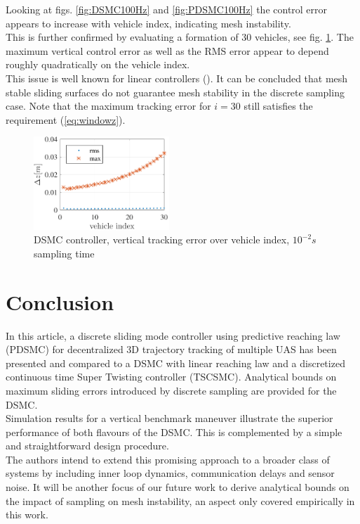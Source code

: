 \documentclass{ifacconf}
\newcommand{\idxFollower}{{\ensuremath{i} }}
\begin{document}
Looking at figs.  \ref{fig:DSMC100Hz} and \ref{fig:PDSMC100Hz} the control error appears to increase with vehicle index, indicating mesh instability.\\
This is further confirmed by evaluating a formation of 30 vehicles, see fig. \ref{fig:errroamplification}. The maximum vertical control error as well as the RMS  error appear to depend roughly quadratically on the vehicle index.\\
This issue is well known for linear controllers (\cite{Pant2002}). It can be concluded that mesh stable sliding surfaces do not guarantee mesh stability in the discrete sampling case.
Note that the maximum tracking error for $\idxFollower = 30$ still satisfies the requirement (\ref{eq:windowz}).
\begin{figure}[h!]
\begin{center}
\includegraphics[height=3.5cm]{erroramplification-DSMC-100Hz-TIMESCALESEPARATION-turbulence=1-turbulenceonlyfirstUAS}    %
\caption{ DSMC controller, vertical tracking error over vehicle index, $10^{-2} s$ sampling time}
\label{fig:errroamplification}
\end{center}
\end{figure}
{\section{Conclusion}
\label{sec:conclusion}
In this article, a discrete sliding mode controller using predictive reaching law (PDSMC) for decentralized 3D trajectory tracking of multiple UAS has been presented and compared to a DSMC with linear reaching law and a discretized continuous time Super Twisting controller (TSCSMC). Analytical bounds on maximum sliding errors introduced by discrete sampling are provided for the DSMC.\\ 
Simulation results for a vertical benchmark maneuver illustrate the superior performance of both flavours of the DSMC. This is complemented by a simple and straightforward design procedure.\\ 
The authors intend to extend this promising approach to a broader class of systems by including inner loop dynamics, communication delays and sensor noise. It will be another focus of our future work to derive analytical bounds on the impact of sampling on mesh instability, an aspect only covered empirically in this work.
}
\end{document}
